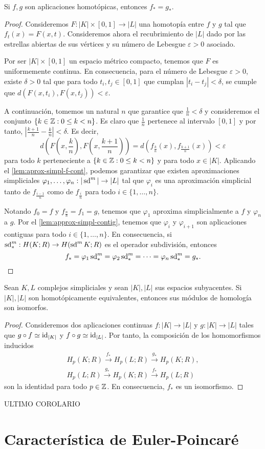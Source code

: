 \begin{teorema}
	Si $f,g$ son aplicaciones homotópicas, entonces $f_*=g_*$.
\end{teorema}
\begin{proof}
	Consideremos $F: |K| \times [0,1] \to |L|$ una homotopía entre $f$ y $g$ tal que $f_t(x) = F(x,t)$. Consideremos ahora el recubrimiento de $|L|$ dado por las estrellas abiertas de sus vértices y su número de Lebesgue $\varepsilon > 0$ asociado.
	
	Por ser $|K| \times [0,1]$ un espacio métrico compacto, tenemos que $F$ es uniformemente continua. En consecuencia, para el número de Lebesgue $\varepsilon > 0$, existe $\delta > 0$ tal que para todo $t_i, t_j \in [0,1]$ que cumplan $|t_i - t_j| < \delta$, se cumple que $d(F(x,t_i),F(x,t_j)) < \varepsilon$.
	
	A continuación, tomemos un natural $n$ que garantice que $\frac{1}{n} < \delta$ y consideremos el conjunto $\{ k \in \mathbb{Z} : 0 \leq k < n \}$. Es claro que $\frac{1}{n}$ pertenece al intervalo $[0,1]$ y por tanto, $|\frac{k+1}{n} - \frac{k}{n}| < \delta$. Es decir,
	\[
	d\left(F(x,\frac{k}{n}), F(x, \frac{k+1}{n})\right) = d\left(f_{\frac{k}{n}}(x), f_{\frac{k+1}{n}}(x)\right) < \varepsilon
	\]
	para todo $k$ perteneciente a $\{k \in \mathbb{Z} : 0 \leq k < n\}$ y para todo $x \in |K|$. Aplicando el \autoref{lem:aprox-simpl-f-cont}, podemos garantizar que existen aproximaciones simpliciales $\varphi_1, \dots, \varphi_n : |\operatorname{sd}^m| \to |L|$ tal que $\varphi_i$ es una aproximación simplicial tanto de $f_{\frac{i-1}{n}}$ como de $f_{\frac{i}{n}}$ para todo $i \in \{1, \dots, n\}$. 
	
	Notando $f_0 = f$ y $f_{\frac{n}{n}} = f_1 = g$, tenemos que $\varphi_1$ aproxima simplicialmente a $f$ y $\varphi_{n}$ a $g$. Por el \autoref{lem:approx-simpl-contig}, tenemos que $\varphi_i$ y $\varphi_{i+1}$ son aplicaciones contiguas para todo $i \in \{1, \dots, n\}$. En consecuencia, si $\operatorname{sd}^m_* : H(K;R) \to H(\operatorname{sd}^m K;R)$ es el operador subdivisión, entonces
	\[
		f_* = \varphi_1 \operatorname{sd}^m_* = \varphi_2 \operatorname{sd}^m_* = \dots = \varphi_{n} \operatorname{sd}^m_* = g_*.
	\]
\end{proof}
\begin{corolario}
	Sean $K,L$ complejos simpliciales y sean $|K|,|L|$ sus espacios subyacentes. Si $|K|,|L|$ son homotópicamente equivalentes, entonces sus módulos de homología son isomorfos.
\end{corolario}
\begin{proof}
	Consideremos dos aplicaciones continuas $f: |K| \to |L|$ y $g: |K| \to |L|$ tales que $g \circ f \simeq \operatorname{id}_{|K|}$ y $f \circ g \simeq \operatorname{id}_{|L|}$. Por tanto, la composición de los homomorfismos inducidos
	\begin{gather*}
		H_p(K;R) \overset{f_*}{\to} H_p(L;R) \overset{g_*}{\to} H_p(K;R), \\
		H_p(L;R) \overset{g_*}{\to} H_p(K;R) \overset{f_*}{\to} H_p(L;R)
	\end{gather*}
	son la identidad para todo $p \in \mathbb{Z}$. En consecuencia, $f_*$ es un isomorfismo.
\end{proof}
ULTIMO COROLARIO

\section{Característica de Euler-Poincaré}

\endinput
